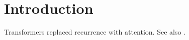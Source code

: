\section{Introduction}
Transformers \cite{vaswani2017attention} replaced recurrence with attention.
See also \cite{undefined2024}.
